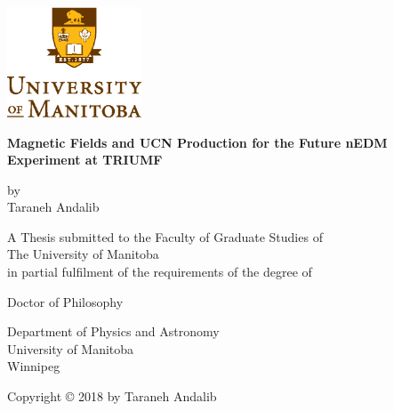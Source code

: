 \documentclass[12pt,a4paper]{book}
\begin{document}

\noindent
\begin{titlepage}
  \begin{center}
         \includegraphics[width=0.3\textwidth]{university.eps}\\
        \vspace*{1cm}
        
        \textbf{Magnetic Fields and UCN Production for the Future
          nEDM Experiment at TRIUMF}
        
        \vspace{0.5cm}
        
        \vspace{1.5cm}
        
        by\\
        \vspace{1.0cm}
        Taraneh Andalib

        \vspace{2.5cm}
        A Thesis submitted to the Faculty of Graduate Studies of\\
        \vspace{0.5cm}
        The University of Manitoba\\
        \vspace{0.5cm}
        in partial fulfilment of the requirements of the degree of
        
        \vspace{2.0cm}
        
       
        Doctor of Philosophy\\
       \vspace{0.5cm}
        
   
        \vspace{0.5cm}
        Department of Physics and Astronomy\\
        University of Manitoba\\
        Winnipeg

        \vspace{3.0cm}
        Copyright © 2018 by Taraneh Andalib
        
    \end{center}
\end{titlepage}
\end{document}

